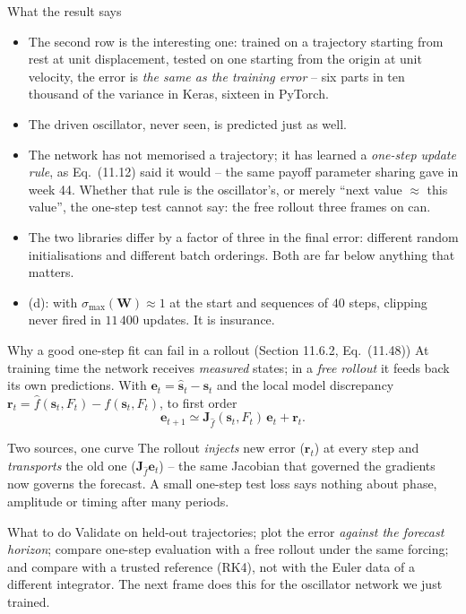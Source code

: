 \documentclass[10pt,aspectratio=169]{beamer}
\begin{document}
\begin{frame}{What the result says}
\begin{itemize}
  \item The second row is the interesting one: trained on a trajectory
        starting from rest at unit displacement, tested on one starting from
        the origin at unit velocity, the error is \emph{the same as the
        training error} -- six parts in ten thousand of the variance in
        Keras, sixteen in PyTorch.
  \item The driven oscillator, never seen, is predicted just as well.
  \item The network has not memorised a trajectory; it has learned a
        \emph{one-step update rule}, as Eq.~(11.12) said it would -- the same
        payoff parameter sharing gave in week 44.  Whether that rule is the
        oscillator's, or merely ``next value $\approx$ this value'', the
        one-step test cannot say: the free rollout three frames on can.
  \item The two libraries differ by a factor of three in the final error:
        different random initialisations and different batch orderings.
        Both are far below anything that matters.
  \item (d): with $\sigma_{\max}(\bm{W})\approx1$ at the start and sequences
        of $40$ steps, clipping never fired in $11\,400$ updates.  It is
        insurance.
\end{itemize}
\end{frame}

\begin{frame}{Why a good one-step fit can fail in a rollout (Section 11.6.2, Eq.~(11.48))}
At training time the network receives \emph{measured} states; in a
\emph{free rollout} it feeds back its own predictions.  With
$\bm{e}_t=\hat{\bm{s}}_t-\bm{s}_t$ and the local model discrepancy
$\bm{r}_t=\hat f(\bm{s}_t,F_t)-f(\bm{s}_t,F_t)$, to first order
\[
  \bm{e}_{t+1}\simeq\bm{J}_{\hat f}(\bm{s}_t,F_t)\,\bm{e}_t+\bm{r}_t .
\]
\begin{block}{Two sources, one curve}
The rollout \emph{injects} new error ($\bm{r}_t$) at every step and
\emph{transports} the old one ($\bm{J}_{\hat f}\bm{e}_t$) -- the same
Jacobian that governed the gradients now governs the forecast.  A small
one-step test loss says nothing about phase, amplitude or timing after many
periods.
\end{block}
\begin{block}{What to do}
Validate on held-out trajectories; plot the error \emph{against the forecast
horizon}; compare one-step evaluation with a free rollout under the same
forcing; and compare with a trusted reference (RK4), not with the Euler data
of a different integrator.  The next frame does this for the oscillator
network we just trained.
\end{block}
\end{frame}
\end{document}
